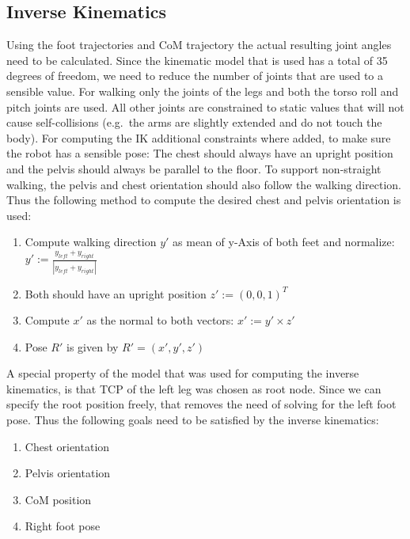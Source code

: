 \documentclass[english,ngerman]{KITreprt}
\begin{document}
\subsection{Inverse Kinematics}\label{inverse-kinematics}

Using the foot trajectories and CoM trajectory the actual resulting
joint angles need to be calculated. Since the kinematic model that is
used has a total of 35 degrees of freedom, we need to reduce the number
of joints that are used to a sensible value. For walking only the joints
of the legs and both the torso roll and pitch joints are used. All other
joints are constrained to static values that will not cause
self-collisions (e.g.~the arms are slightly extended and do not touch
the body). For computing the IK additional constraints where added, to
make sure the robot has a sensible pose: The chest should always have an
upright position and the pelvis should always be parallel to the floor.
To support non-straight walking, the pelvis and chest orientation should
also follow the walking direction. Thus the following method to compute
the desired chest and pelvis orientation is used:

\begin{enumerate}
\def\labelenumi{\arabic{enumi}.}
\item
  Compute walking direction $y'$ as mean of y-Axis of both feet and
  normalize: $y' := \frac{y_{left} + y_{right}}{|y_{left} + y_{right}|}$
\item
  Both should have an upright position $z' := (0, 0, 1)^T$
\item
  Compute $x'$ as the normal to both vectors: $x' := y' \times z'$
\item
  Pose $R'$ is given by $R' = (x', y', z')$
\end{enumerate}

A special property of the model that was used for computing the inverse
kinematics, is that TCP of the left leg was chosen as root node. Since
we can specify the root position freely, that removes the need of
solving for the left foot pose. Thus the following goals need to be
satisfied by the inverse kinematics:

\begin{enumerate}
\def\labelenumi{\arabic{enumi}.}
\item
  Chest orientation
\item
  Pelvis orientation
\item
  CoM position
\item
  Right foot pose
\end{enumerate}
\end{document}
